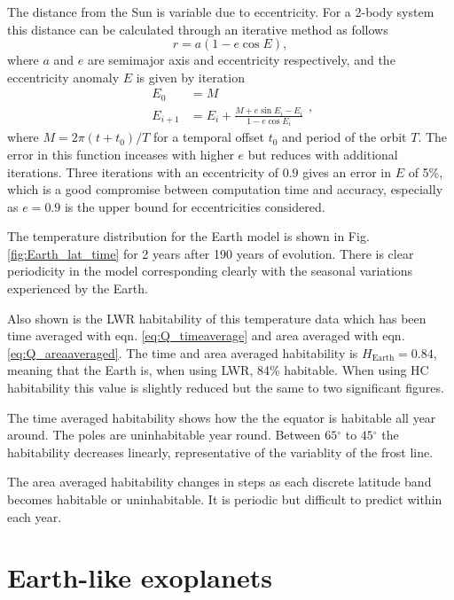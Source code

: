 \documentclass[12pt, onecolumn]{revtex4-2}    %
\newcommand{\degrees}{\ensuremath{^{\circ}}}
\begin{document}
The distance from the Sun is variable due to eccentricity.
For a 2-body system this distance can be calculated through an iterative method as follows
\begin{equation}
  r = a (1 - e \cos E), \label{eq:two_body_distance}
\end{equation}
where $a$ and $e$ are semimajor axis and eccentricity respectively, and the eccentricity anomaly $E$ is given by iteration
\begin{equation}
  \begin{split}
    E_0 &= M \\
    E_{i+1} &= E_i + \frac{M + e \sin E_i - E_i}{1-e \cos E_i}
  \end{split},
  \label{eq:two_body_angle}
\end{equation}
where $M = 2\pi (t + t_0) / T$ for a temporal offset $t_0$ and period of the orbit $T$.
The error in this function inceases with higher $e$ but reduces with additional iterations.
Three iterations with an eccentricity of $0.9$ gives an error in $E$ of 5\%, which is a good compromise between computation time and accuracy, especially as $e=0.9$ is the upper bound for eccentricities considered.

The temperature distribution for the Earth model is shown in Fig. \ref{fig:Earth_lat_time} for 2 years after 190 years of evolution.
There is clear periodicity in the model corresponding clearly with the seasonal variations experienced by the Earth.

Also shown is the LWR habitability of this temperature data which has been time averaged with eqn. \eqref{eq:Q_timeaverage} and area averaged with eqn. \eqref{eq:Q_areaaveraged}.
The time and area averaged habitability is $H_\text{Earth} = 0.84$, meaning that the Earth is, when using LWR, 84\% habitable.
When using HC habitability this value is slightly reduced but the same to two significant figures.

The time averaged habitability shows how the the equator is habitable all year around.
The poles are uninhabitable year round.
Between $65\degrees$ to $45\degrees$ the habitability decreases linearly, representative of the variablity of the frost line.

The area averaged habitability changes in steps as each discrete latitude band becomes habitable or uninhabitable.
It is periodic but difficult to predict within each year.

\section{Earth-like exoplanets} \label{sec:Exoplanets}
\end{document}
